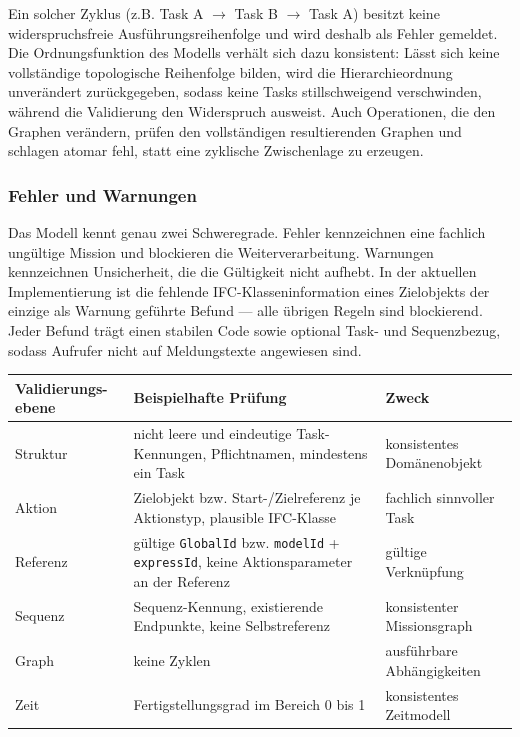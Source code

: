 Ein solcher Zyklus (z.B. Task A $\rightarrow$ Task B $\rightarrow$ Task A) besitzt keine widerspruchsfreie
Ausführungsreihenfolge und wird deshalb als Fehler gemeldet. Die Ordnungsfunktion des Modells
verhält sich dazu konsistent: Lässt sich keine vollständige topologische Reihenfolge bilden, wird
die Hierarchieordnung unverändert zurückgegeben, sodass keine Tasks stillschweigend verschwinden,
während die Validierung den Widerspruch ausweist. Auch Operationen, die den Graphen verändern,
prüfen den vollständigen resultierenden Graphen und schlagen atomar fehl, statt eine zyklische
Zwischenlage zu erzeugen.

\subsubsection{Fehler und Warnungen}
Das Modell kennt genau zwei Schweregrade. Fehler kennzeichnen eine fachlich ungültige Mission und
blockieren die Weiterverarbeitung. Warnungen kennzeichnen Unsicherheit, die die Gültigkeit nicht
aufhebt. In der aktuellen Implementierung ist die fehlende IFC-Klasseninformation eines Zielobjekts
der einzige als Warnung geführte Befund — alle übrigen Regeln sind blockierend. Jeder Befund trägt
einen stabilen Code sowie optional Task- und Sequenzbezug, sodass Aufrufer nicht auf Meldungstexte
angewiesen sind.

\begin{table}[htbp]
  \centering
  \small
  \renewcommand{\arraystretch}{1.3}
  \begin{tabularx}{\textwidth}{@{}|>{\raggedright\arraybackslash}p{}|X|>{\raggedright\arraybackslash}p{}|@{}}
    \hline
    \textbf{Validierungs-ebene} & \textbf{Beispielhafte Prüfung} & \textbf{Zweck} \\
    \hline
    Struktur & nicht leere und eindeutige Task-Kennungen, Pflichtnamen, mindestens ein Task & konsistentes Domänenobjekt \\
    \hline
    Aktion & Zielobjekt bzw. Start-/Zielreferenz je Aktionstyp, plausible IFC-Klasse & fachlich sinnvoller Task \\
    \hline
    Referenz & gültige \texttt{GlobalId} bzw. \texttt{modelId} + \texttt{expressId}, keine Aktionsparameter an der Referenz & gültige Verknüpfung \\
    \hline
    Sequenz & Sequenz-Kennung, existierende Endpunkte, keine Selbstreferenz & konsistenter Missionsgraph \\
    \hline
    Graph & keine Zyklen & ausführbare Abhängigkeiten \\
    \hline
    Zeit & Fertigstellungsgrad im Bereich 0 bis 1 & konsistentes Zeitmodell \\
    \hline
  \end{tabularx}
\end{table}

